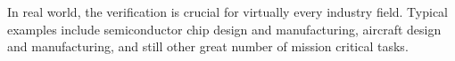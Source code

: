 \documentclass{article}
\begin{document}
In real world, the verification is crucial for virtually every industry field.
Typical examples include
semiconductor chip design and manufacturing,
aircraft design and manufacturing,
and still other great number of mission critical tasks.


%
%
%
%
%
%

%

\end{document}
